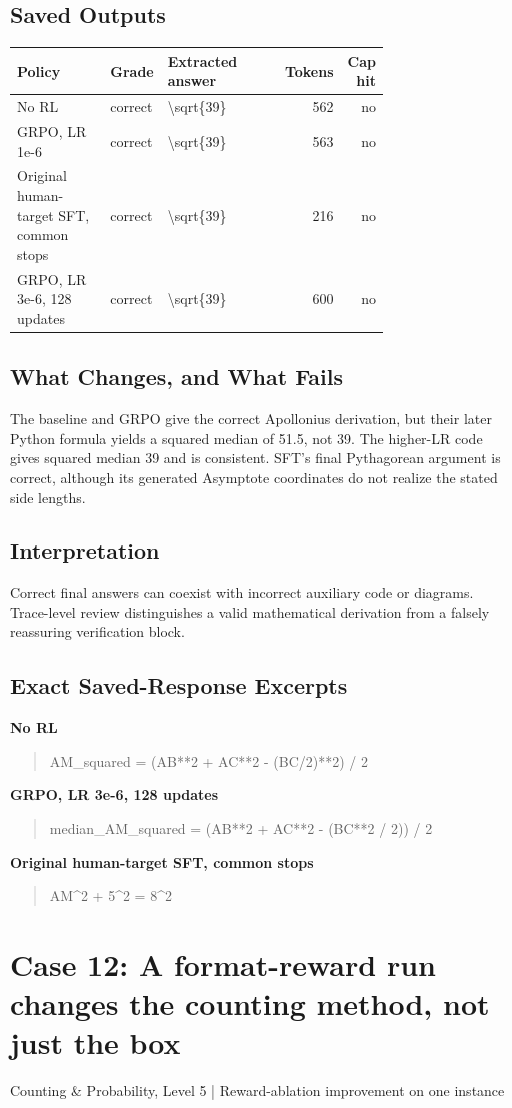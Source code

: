 \documentclass[10pt,letterpaper]{article}
\begin{document}
\subsection*{Saved Outputs}
\small\begin{longtable}{p{0.29\linewidth}p{0.10\linewidth}p{0.35\linewidth}rr}\toprule Policy & Grade & Extracted answer & Tokens & Cap hit\\\midrule
No RL & correct & \textbackslash{}sqrt\{39\} & 562 & no\\
GRPO, LR 1e-6 & correct & \textbackslash{}sqrt\{39\} & 563 & no\\
Original human-target SFT, common stops & correct & \textbackslash{}sqrt\{39\} & 216 & no\\
GRPO, LR 3e-6, 128 updates & correct & \textbackslash{}sqrt\{39\} & 600 & no\\
\bottomrule\end{longtable}\normalsize
\subsection*{What Changes, and What Fails}
The baseline and GRPO give the correct Apollonius derivation, but their later Python formula yields a squared median of 51.5, not 39. The higher-LR code gives squared median 39 and is consistent. SFT's final Pythagorean argument is correct, although its generated Asymptote coordinates do not realize the stated side lengths.
\subsection*{Interpretation}
Correct final answers can coexist with incorrect auxiliary code or diagrams. Trace-level review distinguishes a valid mathematical derivation from a falsely reassuring verification block.
\subsection*{Exact Saved-Response Excerpts}
\textbf{No RL}
\begin{quote}\small\raggedright AM\_squared = (AB**2 + AC**2 - (BC/2)**2) / 2\end{quote}
\textbf{GRPO, LR 3e-6, 128 updates}
\begin{quote}\small\raggedright median\_AM\_squared = (AB**2 + AC**2 - (BC**2 / 2)) / 2\end{quote}
\textbf{Original human-target SFT, common stops}
\begin{quote}\small\raggedright AM\textasciicircum{}2 + 5\textasciicircum{}2 = 8\textasciicircum{}2\end{quote}
\clearpage\section*{Case 12: A format-reward run changes the counting method, not just the box}
Counting \& Probability, Level 5 | Reward-ablation improvement on one instance
\end{document}
